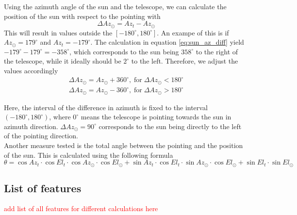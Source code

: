 Using the azimuth angle of the sun and the telescope, we can calculate the position of the sun with respect to the pointing with
\begin{equation}\label{eq:sun_az_diff}
    \Delta \textit{Az}_\odot = \textit{Az}_{\textit{t}} - \textit{Az}_\odot
\end{equation}
This will result in values outside the $[-180^\circ,180^\circ]$. An exampe of this is if $Az_\odot=179^\circ$ and $Az_t = -179^\circ$.
The calculation in equation \eqref{eq:sun_az_diff} yield $-179^\circ-179^\circ=-358^\circ$,
which corresponds to the sun being $358^\circ$ to the right of the telescope, while it ideally should be $2^\circ$ to the left.
Therefore, we adjust the values accordingly
\begin{align}
    \Delta Az_\odot = Az_\odot +360^\circ, \; \text{for} \; \Delta Az_\odot < 180^\circ\\
    \Delta Az_\odot = Az_\odot -360^\circ, \; \text{for} \; \Delta Az_\odot > 180^\circ
\end{align}

Here, the interval of the difference in azimuth is fixed to the interval $(-180^\circ,180^\circ)$,
where $0^\circ$ means the telescope is pointing towards the sun in azimuth direction.
$\Delta \textit{Az}_\odot = 90^\circ$ corresponds to the sun being directly to the left of the pointing direction. \\

Another measure tested is the total angle between the pointing and the position of the sun. This is calculated using the following formula
\begin{equation}
    \theta = \cos \textit{Az}_t \cdot \cos \textit{El}_t\cdot \cos \textit{Az}_\odot \cdot \cos \textit{El}_\odot + \sin \textit{Az}_t \cdot \cos \textit{El}_t\cdot \sin \textit{Az}_\odot \cdot \cos \textit{El}_\odot + \sin \textit{El}_t \cdot \sin \textit{El}_\odot
\end{equation}

\subsection{List of features}
\textcolor{red}{add list of all features for different calculations here}

